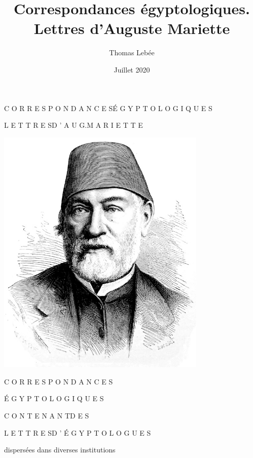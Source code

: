 \documentclass{book}
\title{Correspondances égyptologiques. Lettres d’Auguste Mariette}
\author{Thomas Lebée}
\date{Juillet 2020}
\begin{document}
\begin{titlepage}
\frontmatter
\centering
\hspace{0pt}
\vfill
\large
C O R R E S P O N D A N C E S\space\space\space É G Y P T O L O G I Q U E S \vspace{3\baselineskip}

\Large L E T T R E S\space\space\space D ’ A U G.\space\space\space M A R I E T T E
\vspace{15\baselineskip}
\vfill
\hspace{0pt}

\pagebreak
\thispagestyle{empty}
\hspace{0pt}
\vfill
\includegraphics[height=12cm]{CoEg_Mariette_portrait.jpg}
\vfill
\hspace{0pt}

\pagebreak
\thispagestyle{empty}

\LARGE{C O R R E S P O N D A N C E S}
    
\Huge{É G Y P T O L O G I Q U E S}
\vspace{1\baselineskip}

\large C O N T E N A N T\space\space\space D E S
\vspace{1\baselineskip}

\Large L E T T R E S\space\space\space D ’ É G Y P T O L O G U E S
\vspace{2\baselineskip}

\large dispersées dans diverses institutions
\vspace{1\baselineskip}


\end{titlepage}
\end{document}
